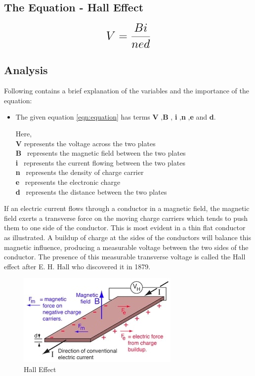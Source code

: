 \subsection{The Equation - Hall Effect}

\begin{equation}
 {\LARGE{\textbf{$V =\frac{Bi}{{ned}}$}}}
 \label{eqn:equation}
\end{equation}


\subsection{Analysis}
Following contains a brief explanation of the variables and the importance of the equation:
\begin{itemize}
\item {\normalsize {The given equation \ref{eqn:equation} has terms \textbf{V} ,\textbf{B} , \textbf{i} ,\textbf{n} ,\textbf{e} and  \textbf{d}.}}

{ Here,}\\
{\textbf{V} represents the voltage across the two plates }\\
{\textbf{B} \  represents the magnetic field between the two plates}\\
{\textbf{i} \  represents the current flowing between the two plates}\\
{\textbf{n} \  represents the density of charge carrier}\\
{\textbf{e} \ represents the electronic charge}\\
{\textbf{d} \ represents the distance between the two plates}
\end{itemize}

If an electric current flows through a conductor in a magnetic field, the magnetic field exerts a transverse force on the moving charge carriers which tends to push them to one side of the conductor. This is most evident in a thin flat conductor as illustrated. A buildup of charge at the sides of the conductors will balance this magnetic influence, producing a measurable voltage between the two sides of the conductor. The presence of this measurable transverse voltage is called the Hall effect after E. H. Hall who discovered it in 1879. \cite{weblink1}

\begin{figure}[h]
	{\begin{center}
		\includegraphics[scale=0.60]{ME20B004.jpg}
	\end{center}}
	\caption{Hall Effect \cite{pic}}
	\label{f1:image}
\end{figure}


